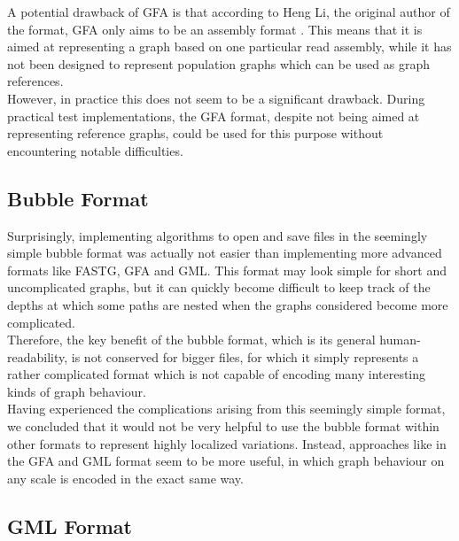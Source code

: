 \documentclass[a4paper,12pt,twoside,BCOR=10mm]{scrbook}
\begin{document}
A potential drawback of GFA is that
according to Heng Li, the original author of the format, GFA only aims to be an assembly format \citep{specGFA3}.
This means that it is aimed at representing a graph based on one particular read assembly,
while it has not been designed to represent population graphs which can be used as graph references. \\
However, in practice this does not seem to be a significant drawback.
During practical test implementations, the GFA format, despite not being aimed at representing reference graphs,
could be used for this purpose without encountering notable difficulties.

\subsection{Bubble Format}

Surprisingly, implementing algorithms to open and save files in the seemingly simple bubble format was actually
not easier than implementing more advanced formats like FASTG, GFA and GML.
This format may look simple for short and uncomplicated graphs,
but it can quickly become difficult to keep track of the depths at which some paths
are nested when the graphs considered become more complicated. \\
Therefore, the key benefit of the bubble format, which is its general human-readability,
is not conserved for bigger files, for which it simply represents a rather complicated format
which is not capable of encoding many interesting kinds of graph behaviour. \\
Having experienced the complications arising from this seemingly simple format,
we concluded that it would not be very helpful to use the bubble format within
other formats to represent highly localized variations.
Instead, approaches like in the GFA and GML format seem to be more useful,
in which graph behaviour on any scale is encoded in the exact same way.

\subsection{GML Format}
\end{document}
